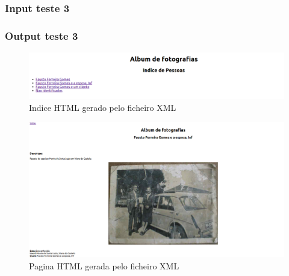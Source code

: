 \subsubsection{Input teste 3}
\label{seq:anex-museu-test-in03}


\subsubsection{Output teste 3}
\label{seq:anex-museu-test-out03-01}


\begin{figure}[H]
\centering
\includegraphics[width=15cm]{anexos/2-1/Exemplo3/Screenshots/indice.png}
\caption{Indice HTML gerado pelo ficheiro XML}
\end{figure}

\label{seq:anex-museu-test-out03-02}


\begin{figure}[H]
\centering
\includegraphics[width=15cm]{anexos/2-1/Exemplo3/Screenshots/pag2.png}
\caption{Pagina HTML gerada pelo ficheiro XML}
\end{figure}

\label{seq:anex-museu-test-out03-03}


